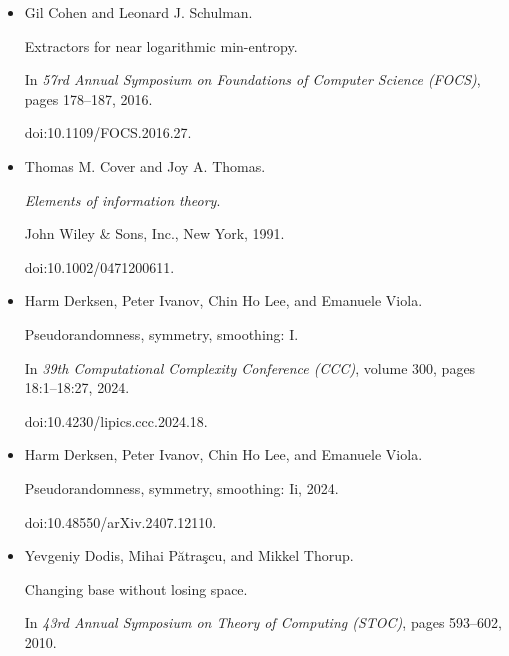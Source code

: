 \begin{itemize}
doi:10.4007/annals.2019.189.3.1.





\item[] 
[11]

Gil Cohen and Leonard J. Schulman.


Extractors for near logarithmic min-entropy.


In \emph{57rd Annual Symposium on Foundations of Computer Science
(FOCS)}, pages 178–187, 2016.


doi:10.1109/FOCS.2016.27.





\item[] 
[12]

Thomas M. Cover and Joy A. Thomas.


\emph{Elements of information theory}.


John Wiley \& Sons, Inc., New York, 1991.


doi:10.1002/0471200611.





\item[] 
[13]

Harm Derksen, Peter Ivanov, Chin Ho Lee, and Emanuele Viola.


Pseudorandomness, symmetry, smoothing: I.


In \emph{39th Computational Complexity Conference (CCC)}, volume 300,
pages 18:1–18:27, 2024.


doi:10.4230/lipics.ccc.2024.18.





\item[] 
[14]

Harm Derksen, Peter Ivanov, Chin Ho Lee, and Emanuele Viola.


Pseudorandomness, symmetry, smoothing: Ii, 2024.


doi:10.48550/arXiv.2407.12110.





\item[] 
[15]

Yevgeniy Dodis, Mihai Pătraşcu, and Mikkel Thorup.


Changing base without losing space.


In \emph{43rd Annual Symposium on Theory of Computing (STOC)}, pages
593–602, 2010.



\end{itemize}
